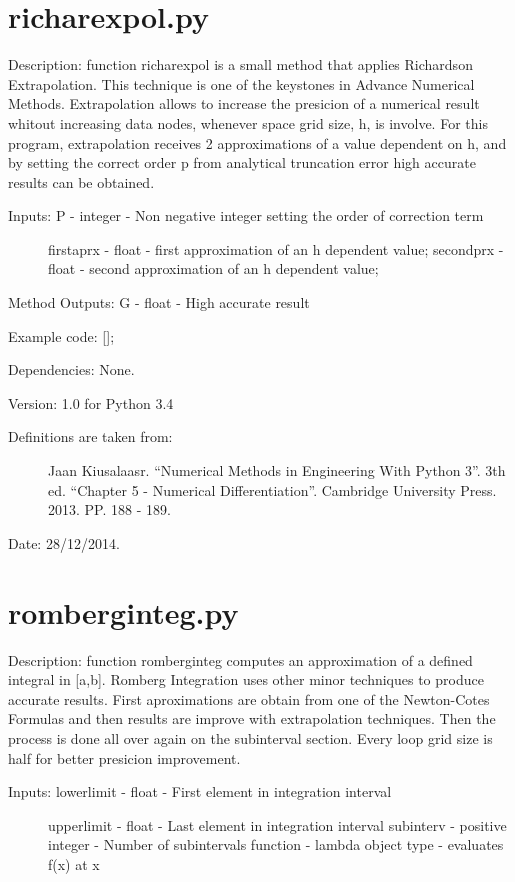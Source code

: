 \documentclass[letterpaper,10pt,oneside]{sphinxmanual}
\theoremstyle{plain}%
\theoremstyle{definition}%
\theoremstyle{remark}%
\begin{document}
\section{richarexpol.py}
\label{code:module-richarexpol}\label{code:richarexpol-py}
Description: function richarexpol is a small method that applies Richardson
Extrapolation. This technique is one of the keystones in Advance Numerical
Methods. Extrapolation allows to increase the presicion of a numerical 
result whitout increasing data nodes, whenever space grid size, h, is involve.
For this program, extrapolation receives 2 approximations of a value dependent
on h, and by setting the correct order p from analytical truncation error
high accurate results can be obtained.
\begin{description}
\item[{Inputs: P - integer - Non negative integer setting the order of correction term}] \leavevmode
firstaprx - float - first approximation of an h dependent value;
secondprx - float - second approximation of an h dependent value;

\end{description}

Method Outputs: G - float - High accurate result

Example code: {[}{]};

Dependencies: None.

Version: 1.0 for Python 3.4
\begin{description}
\item[{Definitions are taken from:}] \leavevmode
Jaan Kiusalaasr. ``Numerical Methods in Engineering With Python 3''.
3th ed. ``Chapter 5 - Numerical Differentiation''. 
Cambridge University Press. 2013. PP. 188 - 189.

\end{description}




Date: 28/12/2014.


\section{romberginteg.py}
\label{code:module-romberginteg}\label{code:romberginteg-py}
Description: function romberginteg computes an approximation of a defined
integral in {[}a,b{]}. Romberg Integration uses other minor techniques to produce
accurate results. First aproximations are obtain from one of the Newton-Cotes
Formulas and then results are improve with extrapolation techniques. Then
the process is done all over again on the subinterval section. Every loop
grid size is half for better presicion improvement.
\begin{description}
\item[{Inputs: lowerlimit - float - First element in integration interval}] \leavevmode
upperlimit - float - Last element in integration interval
subinterv - positive integer - Number of subintervals
function - lambda object type - evaluates f(x) at x

\end{description}
\end{document}
